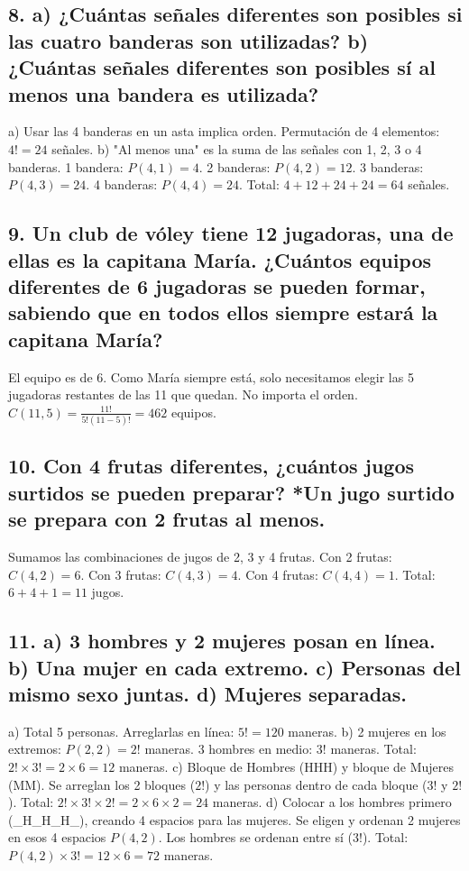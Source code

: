 \documentclass[11pt]{article}
\begin{document}
    \subsection*{8. a) ¿Cuántas señales diferentes son posibles si las cuatro banderas son utilizadas? b) ¿Cuántas señales diferentes son posibles sí al menos una bandera es utilizada?}
    a) Usar las 4 banderas en un asta implica orden. Permutación de 4 elementos: $4! = 24$ señales.
    b) "Al menos una" es la suma de las señales con 1, 2, 3 o 4 banderas.
    1 bandera: $P(4,1) = 4$. 2 banderas: $P(4,2) = 12$. 3 banderas: $P(4,3) = 24$. 4 banderas: $P(4,4) = 24$.
    Total: $4 + 12 + 24 + 24 = 64$ señales.

    \subsection*{9. Un club de vóley tiene 12 jugadoras, una de ellas es la capitana María. ¿Cuántos equipos diferentes de 6 jugadoras se pueden formar, sabiendo que en todos ellos siempre estará la capitana María?}
    El equipo es de 6. Como María siempre está, solo necesitamos elegir las 5 jugadoras restantes de las 11 que quedan. No importa el orden. $C(11,5) = \frac{11!}{5!(11-5)!} = 462$ equipos.

    \subsection*{10. Con 4 frutas diferentes, ¿cuántos jugos surtidos se pueden preparar? *Un jugo surtido se prepara con 2 frutas al menos.}
    Sumamos las combinaciones de jugos de 2, 3 y 4 frutas.
    Con 2 frutas: $C(4,2)=6$. Con 3 frutas: $C(4,3)=4$. Con 4 frutas: $C(4,4)=1$.
    Total: $6+4+1=11$ jugos.
    
    \subsection*{11. a) 3 hombres y 2 mujeres posan en línea. b) Una mujer en cada extremo. c) Personas del mismo sexo juntas. d) Mujeres separadas.}
    a) Total 5 personas. Arreglarlas en línea: $5! = 120$ maneras.
    b) 2 mujeres en los extremos: $P(2,2)=2!$ maneras. 3 hombres en medio: $3!$ maneras. Total: $2! \times 3! = 2 \times 6 = 12$ maneras.
    c) Bloque de Hombres (HHH) y bloque de Mujeres (MM). Se arreglan los 2 bloques ($2!$) y las personas dentro de cada bloque ($3!$ y $2!$). Total: $2! \times 3! \times 2! = 2 \times 6 \times 2 = 24$ maneras.
    d) Colocar a los hombres primero (\_H\_H\_H\_), creando 4 espacios para las mujeres. Se eligen y ordenan 2 mujeres en esos 4 espacios $P(4,2)$. Los hombres se ordenan entre sí ($3!$). Total: $P(4,2) \times 3! = 12 \times 6 = 72$ maneras.
\end{document}
